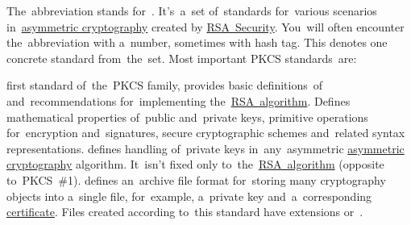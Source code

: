 The~abbreviation stands for~.
It's~a~set of~standards for~various scenarios in~\hyperref[asymmetriccryptography]{asymmetric cryptography} created by \href{https://en.wikipedia.org/wiki/RSA_Security}{RSA~Security}.
You~will often encounter the~abbreviation with a~number, sometimes with hash tag.
This denotes one concrete standard from~the~set.
Most important PKCS standards~are:
\begin{itemize}
     first standard of~the~PKCS family, provides basic definitions~of and~recommendations for~implementing the~\hyperref[rsa]{RSA~algorithm}.
             Defines mathematical properties of~public and~private keys, primitive operations for~encryption and~signatures, secure cryptographic schemes and~related syntax representations.
     defines handling of~private keys in~any~asymmetric \hyperref[asymmetriccryptography]{asymmetric cryptography} algorithm.
             It~isn't fixed only to~the~\hyperref[rsa]{RSA~algorithm} (opposite to~PKCS~\#1).
     defines an~archive file format for~storing many cryptography objects into a~single file, for~example, a~private key and~a~corresponding \hyperref[certificate]{certificate}.
             Files created according to~this standard have extensions  or~.
\end{itemize}
